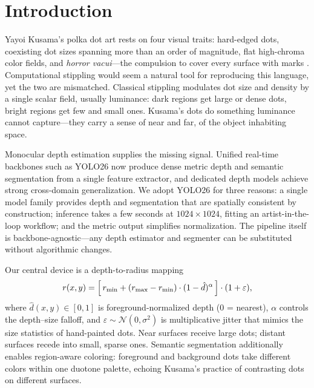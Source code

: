 \section{Introduction}
\label{sec:introduction}

Yayoi Kusama's polka dot art rests on four visual traits: hard-edged
dots, coexisting dot sizes spanning more than an order of magnitude,
flat high-chroma color fields, and \emph{horror vacui}---the
compulsion to cover every surface with marks
\citep{moma_kusama,kusama2011infinity}. Computational stippling would
seem a natural tool for reproducing this language, yet the two are
mismatched. Classical stippling
\citep{deussen2000floating,secord2002weighted} modulates dot size and
density by a single scalar field, usually luminance: dark regions get
large or dense dots, bright regions get few and small ones. Kusama's
dots do something luminance cannot capture---they carry a sense of
near and far, of the object inhabiting space.

Monocular depth estimation supplies the missing signal. Unified
real-time backbones such as YOLO26 \citep{ultralytics2025yolo26} now
produce dense metric depth and semantic segmentation from a single
feature extractor, and dedicated depth models
\citep{ranftl2022towards,yang2024depth} achieve strong
cross-domain generalization. We adopt YOLO26 for three reasons: a
single model family provides depth and segmentation that are spatially
consistent by construction; inference takes a few seconds at
$1024\times1024$, fitting an artist-in-the-loop workflow; and the
metric output simplifies normalization. The pipeline itself is
backbone-agnostic---any depth estimator and segmenter can be
substituted without algorithmic changes.

Our central device is a depth-to-radius mapping
\begin{equation}
    r(x,y) = \Bigl[\, r_{\min} + (r_{\max} - r_{\min}) \cdot (1 - \hat{d})^\alpha \,\Bigr] \cdot (1 + \varepsilon),
    \label{eq:depth_radius}
\end{equation}
where $\hat{d}(x,y) \in [0,1]$ is foreground-normalized depth (0 =
nearest), $\alpha$ controls the depth--size falloff, and
$\varepsilon \sim \mathcal{N}(0, \sigma^2)$ is multiplicative jitter
that mimics the size statistics of hand-painted dots. Near surfaces
receive large dots; distant surfaces recede into small, sparse ones.
Semantic segmentation additionally enables region-aware coloring:
foreground and background dots take different colors within one
duotone palette, echoing Kusama's practice of contrasting dots on
different surfaces.

